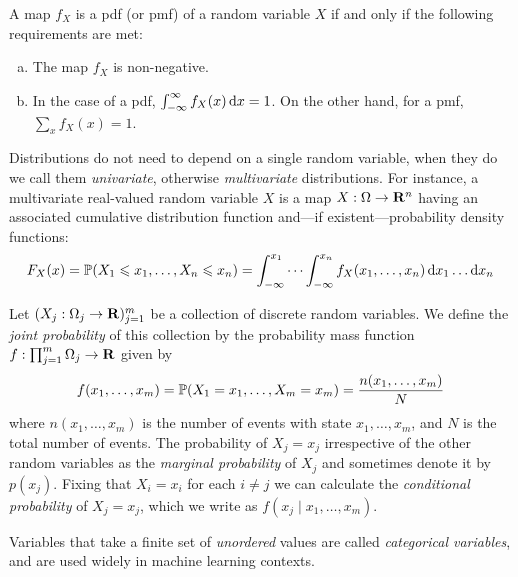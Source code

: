\begin{theorem}
\label{thm:}
A map \(f_X\) is a pdf (or pmf) of a random variable \(X\) if and only if the
following requirements are met:
\begin{enumerate}[(a)]\setlength\itemsep{0em}
\item The map \(f_X\) is non-negative.
\item In the case of a pdf, \(\int_{-\infty}^{\infty} f_X(x)\, \mathrm{d} x = 1\). On
  the other hand, for a pmf, \(\sum_x f_X(x) = 1\).
\end{enumerate}
\end{theorem}

\begin{notation}
\label{not:univariate-multivariate-distributions}
Distributions do not need to depend on a single random variable, when they do we
call them \emph{univariate}, otherwise \emph{multivariate} distributions. For
instance, a multivariate real-valued random variable \(X\) is a map
\(X: \Omega \to \mathbf{R}^n\) having an associated cumulative distribution function
and---if existent---probability density functions:
\[
F_X(x) = \operatorname{\mathbb{P}}(X_1 \leqslant x_1, \dots, X_n \leqslant x_n)
= \int_{-\infty}^{x_1} \cdots \int_{-\infty}^{x_n} f_X(x_1, \dots, x_n)\,
\mathrm{d} x_1 \dots \mathrm{d} x_n
\]
\end{notation}

\begin{definition}
\label{def:joint-probability}
Let \((X_j: \Omega_j \to \mathbf{R})_{j=1}^m\) be a collection of discrete random variables. We
define the \emph{joint probability} of this collection by the probability mass
function \(f: \prod_{j=1}^m \Omega_j \to \mathbf{R}\) given by
\[
f(x_1, \dots, x_m)
= \operatorname{\mathbb{P}}(X_1 = x_1, \dots, X_m = x_m)
= \frac{n(x_1, \dots, x_m)}{N}
\]
where \(n(x_1, \dots, x_m)\) is the number of events with state \(x_1, \dots,
x_m\), and \(N\) is the total number of events. The probability of \(X_j = x_j\)
irrespective of the other random variables as the \emph{marginal probability} of
\(X_j\) and sometimes denote it by \(p(x_j)\). Fixing that \(X_i = x_i\) for
each \(i \neq j\) we can calculate the \emph{conditional probability} of \(X_j
= x_j\), which we write as \(f(x_j \mid x_1, \dots, x_m)\).
\end{definition}

\begin{definition}
\label{def:categorical-variables}
Variables that take a finite set of \emph{unordered} values are called
\emph{categorical variables}, and are used widely in machine learning contexts.
\end{definition}

